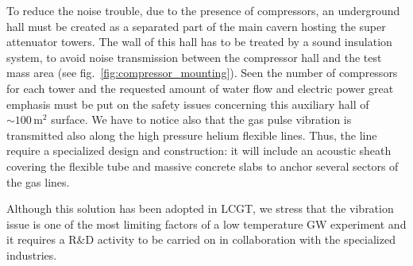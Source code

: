To reduce the noise trouble, due to the presence of compressors, an underground hall must  be created as a separated part of the main cavern hosting the super attenuator towers.  The wall of this hall has to be treated by a sound insulation system, to avoid noise transmission between the compressor hall and the test mass area (see fig.~\ref{fig:compressor_mounting}). Seen the  number of compressors for each tower and the requested amount   of water flow and electric power  great emphasis must be put on the safety  issues  concerning this auxiliary hall of  $\sim 100\,\mathrm{m^2}$   surface.
We have to notice also that the gas pulse vibration is transmitted also   along  the high pressure helium flexible lines. Thus,  the  line require a specialized design and construction:   it will include  an acoustic sheath covering the flexible tube and massive  concrete slabs to anchor several sectors of the gas lines.

Although this solution has been adopted in LCGT,  we stress that the vibration issue  is one of the  most limiting  factors of a low temperature GW experiment and  it requires a  R\&D activity to be carried on in collaboration with the specialized industries.

\FloatBarrier
